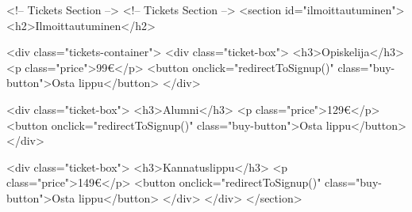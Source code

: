 <!-- Tickets Section -->
<!-- Tickets Section -->
<section id="ilmoittautuminen">
    <h2>Ilmoittautuminen</h2>
    
    <div class="tickets-container">
        <div class="ticket-box">
            <h3>Opiskelija</h3>
            <p class="price">99€</p>
            <button onclick="redirectToSignup()" class="buy-button">Osta lippu</button>
        </div>

        <div class="ticket-box">
            <h3>Alumni</h3>
            <p class="price">129€</p>
            <button onclick="redirectToSignup()" class="buy-button">Osta lippu</button>
        </div>

        <div class="ticket-box">
            <h3>Kannatuslippu</h3>
            <p class="price">149€</p>
            <button onclick="redirectToSignup()" class="buy-button">Osta lippu</button>
        </div>
    </div>
</section>
